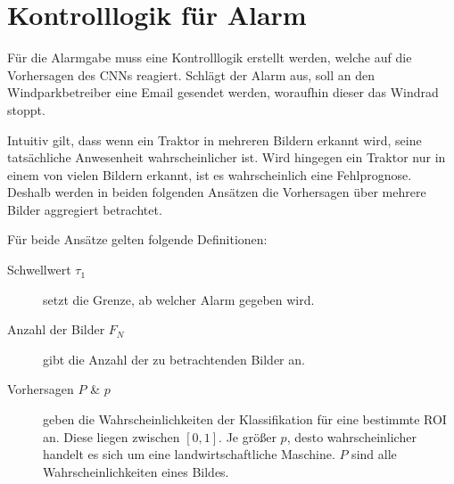 




\section{Kontrolllogik für Alarm}
\label{ch5:alarm}
Für die Alarmgabe muss eine Kontrolllogik erstellt werden, welche auf die Vorhersagen des \ac{CNN}s reagiert.
Schlägt der Alarm aus, soll an den Windparkbetreiber eine Email gesendet werden, woraufhin dieser das Windrad stoppt.

Intuitiv gilt, dass wenn ein Traktor in mehreren Bildern erkannt wird, seine tatsächliche Anwesenheit wahrscheinlicher ist.
Wird hingegen ein Traktor nur in einem von vielen Bildern erkannt, ist es wahrscheinlich eine Fehlprognose.
Deshalb werden in beiden folgenden Ansätzen die Vorhersagen über mehrere Bilder aggregiert betrachtet.

\bigskip
Für beide Ansätze gelten folgende Definitionen:
\begin{description}
    \item[Schwellwert $\tau_1$] 
        setzt die Grenze, ab welcher Alarm gegeben wird.
    \item[Anzahl der Bilder $F_N$] 
        gibt die Anzahl der zu betrachtenden Bilder an.
    \item[Vorhersagen $P$ \& $p$]
        geben die Wahrscheinlichkeiten der Klassifikation für eine bestimmte \ac{ROI} an.
        Diese liegen zwischen $[0,1]$. Je größer $p$, desto wahrscheinlicher handelt es sich um eine landwirtschaftliche Maschine.
        $P$ sind alle Wahrscheinlichkeiten eines Bildes.
\end{description}

